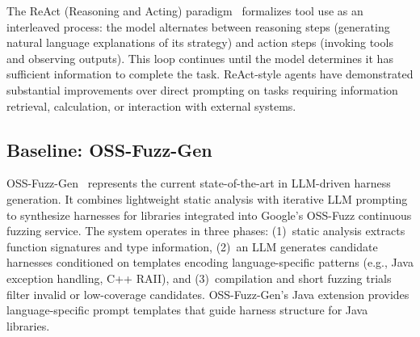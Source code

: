 The ReAct (Reasoning and Acting) paradigm~\cite{DBLP:conf/iclr/YaoZYDN023:ReAct} formalizes tool use as an interleaved process: the model alternates between reasoning steps (generating natural language explanations of its strategy) and action steps (invoking tools and observing outputs). This loop continues until the model determines it has sufficient information to complete the task. ReAct-style agents have demonstrated substantial improvements over direct prompting on tasks requiring information retrieval, calculation, or interaction with external systems.

\subsection{Baseline: OSS-Fuzz-Gen}
\label{sec:prelim:ossfuzzgen}

OSS-Fuzz-Gen~\cite{CITE:OSSFuzzGen} represents the current state-of-the-art in LLM-driven harness generation. It combines lightweight static analysis with iterative LLM prompting to synthesize harnesses for libraries integrated into Google's OSS-Fuzz continuous fuzzing service. The system operates in three phases: (1)~static analysis extracts function signatures and type information, (2)~an LLM generates candidate harnesses conditioned on templates encoding language-specific patterns (e.g., Java exception handling, C++ RAII), and (3)~compilation and short fuzzing trials filter invalid or low-coverage candidates.
OSS-Fuzz-Gen's Java extension provides language-specific prompt templates that guide harness structure for Java libraries. 

